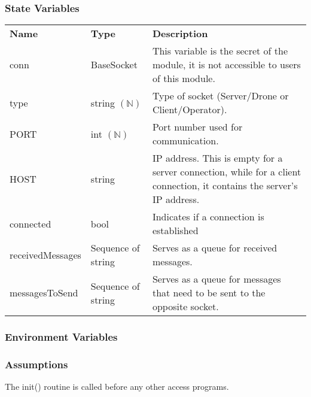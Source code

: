 \documentclass[12pt, titlepage]{article}
\begin{document}
\subsubsection{State Variables}
\begin{center}
\begin{tabular}{p{3 cm} p{3.5cm} p{7cm} }
\hline
\textbf{Name} & \textbf{Type} & \textbf{Description}  \\
conn & BaseSocket & This variable is the secret of the module, it is not accessible to users of this module. \\
type & string $(\mathbb{N})$& Type of socket (Server/Drone or Client/Operator). \\
PORT & int $(\mathbb{N})$& Port number used for communication. \\
HOST & string & IP address. This is empty for a server connection, while for a client connection, it contains the server's IP address. \\
connected & bool & Indicates if a connection is established \\
receivedMessages & Sequence of string & Serves as a queue for received messages. \\
messagesToSend & Sequence of string & Serves as a queue for messages that need to be sent to the opposite socket. \\
\hline
\hline
\end{tabular}
\end{center}
\subsubsection{Environment Variables}
\subsubsection{Assumptions}
The init() routine is called before any other access programs.
\end{document}
